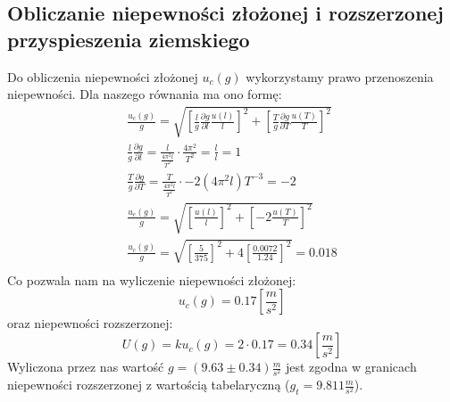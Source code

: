 \documentclass{fizraport}
\begin{document}
\subsection{Obliczanie niepewności złożonej i rozszerzonej przyspieszenia ziemskiego}
Do obliczenia niepewności złożonej $u_c(g)$ wykorzystamy prawo przenoszenia niepewności.
Dla naszego równania ma ono formę:
\begin{equation*}
\begin{split}
\frac{u_c(g)}{g} = \sqrt{ \left[\frac{l}{g}\frac{\partial g}{\partial l}\frac{u(l)}{l}\right]^2+ \left[\frac{T}{g}\frac{\partial g}{\partial T}\frac{u(T)}{T}\right]^2 }\\
\frac{l}{g}\frac{\partial g}{\partial l} = \frac{l}{\frac{4\pi^2 l}{T^2}}\cdot\frac{4\pi^2}{T^2} = \frac{l}{l}=1\\
\frac{T}{g}\frac{\partial g}{\partial T} = \frac{T}{\frac{4\pi^2 l}{T^2}}\cdot-2(4\pi^2l)T^{-3}=-2\\
\frac{u_c(g)}{g} = \sqrt{ \left[\frac{u(l)}{l}\right]^2+ \left[-2\frac{u(T)}{T}\right]^2 }\\
\frac{u_c(g)}{g} = \sqrt{ \left[\frac{5}{375}\right]^2+ 4\left[\frac{0.0072}{1.24}\right]^2 } = 0.018\\
\end{split}
\end{equation*}
Co pozwala nam na wyliczenie niepewności złożonej:
\[u_c(g) = 0.17 \left[\frac{m}{s^2}\right] \]
oraz niepewności rozszerzonej:
\[U(g) =k u_c(g) =2 \cdot 0.17 = 0.34\left[\frac{m}{s^2}\right] \]
Wyliczona przez nas wartość $g=(9.63\pm0.34) \frac{m}{s^2} $ jest zgodna w granicach niepewności rozszerzonej z wartością tabelaryczną ($ g_t = 9.811 \frac{m}{s^2}$).
\pagebreak
\end{document}
